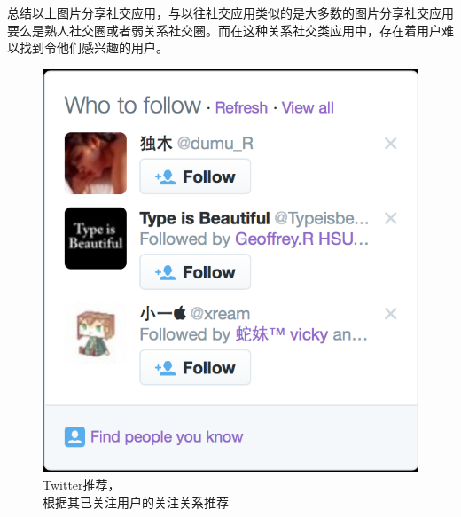 总结以上图片分享社交应用，与以往社交应用类似的是大多数的图片分享社交应用要么是熟人社交圈或者弱关系社交圈。而在这种关系社交类应用中，存在着用户难以找到令他们感兴趣的用户。

\begin{figure}[h] 
\begin{minipage}[t]{0.45\linewidth}
\centering
\includegraphics[width=\textwidth]{img/chap1/twitter_recommend.png}
\caption{Twitter推荐，\\根据其已关注用户的关注关系推荐\label{Twitter推荐，根据其已关注用户的关注关系推荐}}
\end{minipage}
\hfill
\begin{minipage}[t]{0.45\linewidth}
\centering

\end{minipage}
\end{figure}
